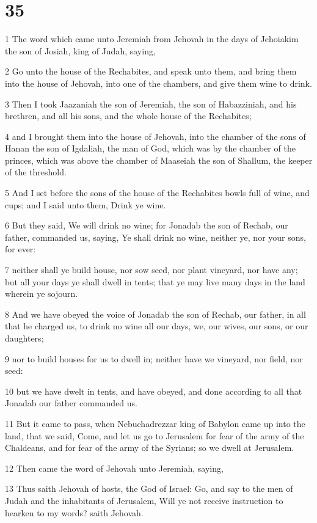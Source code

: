 \chapter{35}

\par 1 The word which came unto Jeremiah from Jehovah in the days of Jehoiakim the son of Josiah, king of Judah, saying,
\par 2 Go unto the house of the Rechabites, and speak unto them, and bring them into the house of Jehovah, into one of the chambers, and give them wine to drink.
\par 3 Then I took Jaazaniah the son of Jeremiah, the son of Habazziniah, and his brethren, and all his sons, and the whole house of the Rechabites;
\par 4 and I brought them into the house of Jehovah, into the chamber of the sons of Hanan the son of Igdaliah, the man of God, which was by the chamber of the princes, which was above the chamber of Maaseiah the son of Shallum, the keeper of the threshold.
\par 5 And I set before the sons of the house of the Rechabites bowls full of wine, and cups; and I said unto them, Drink ye wine.
\par 6 But they said, We will drink no wine; for Jonadab the son of Rechab, our father, commanded us, saying, Ye shall drink no wine, neither ye, nor your sons, for ever:
\par 7 neither shall ye build house, nor sow seed, nor plant vineyard, nor have any; but all your days ye shall dwell in tents; that ye may live many days in the land wherein ye sojourn.
\par 8 And we have obeyed the voice of Jonadab the son of Rechab, our father, in all that he charged us, to drink no wine all our days, we, our wives, our sons, or our daughters;
\par 9 nor to build houses for us to dwell in; neither have we vineyard, nor field, nor seed:
\par 10 but we have dwelt in tents, and have obeyed, and done according to all that Jonadab our father commanded us.
\par 11 But it came to pass, when Nebuchadrezzar king of Babylon came up into the land, that we said, Come, and let us go to Jerusalem for fear of the army of the Chaldeans, and for fear of the army of the Syrians; so we dwell at Jerusalem.
\par 12 Then came the word of Jehovah unto Jeremiah, saying,
\par 13 Thus saith Jehovah of hosts, the God of Israel: Go, and say to the men of Judah and the inhabitants of Jerusalem, Will ye not receive instruction to hearken to my words? saith Jehovah.

